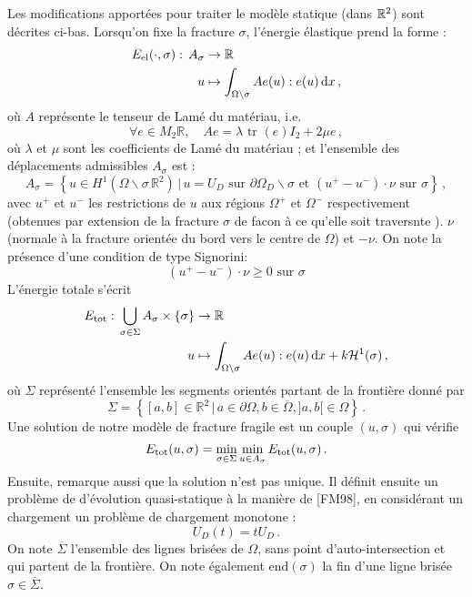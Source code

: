 Les modifications apportées pour traiter le modèle statique (dans $\mathbb{R}^2$) sont décrites ci-bas. Lorsqu'on fixe la fracture $\sigma$, l'énergie élastique prend la forme :
\begin{align*}
\eel (\cdot,\sigma): \, A_{\sigma} &\rightarrow \mathbb{R} \\
u &\mapsto \int_{\Omega \backslash \sigma} Ae(u) : e(u) \diff x \,,
\end{align*}
où $A$ représente le tenseur de Lamé du matériau, i.e.
$$
    \forall e \in M_2{\mathbb{R}}, \quad Ae = \lambda \text{ tr }(e)I_2 + 2\mu e \,,
$$ 
où $\lambda$ et $\mu$ sont les coefficients de Lamé du matériau ; et l'ensemble des déplacements admissibles $A_{\sigma}$ est :
$$
A_{\sigma} = \left\{  u \in H^1(\Omega \backslash \sigma \, \mathbb{R}^2) \, \rvert \, u=U_D \text{ sur } \partial \Omega_D \backslash \sigma \text{ et } (u^+ - u^{-}) \cdot \nu \text{ sur } \sigma \right\} \,,
$$
avec $u^{+}$ et $u^{−}$ les restrictions de $u$ aux régions $\Omega^{+}$ et $\Omega^{-}$ respectivement (obtenues par extension de la fracture $\sigma$ de facon à ce qu'elle soit traversnte \parencite[p.50]{balasoiu2020thesis}). $\nu$ (normale à la fracture orientée du bord vers le centre de $\Omega$) et $−\nu$. On note la présence d'une condition de type Signorini:
$$
(u^+ - u^{-}) \cdot \nu \geq 0 \text{  sur  } \sigma
$$
L'énergie totale s'écrit
\begin{align*}
\etot : \,\bigcup_{\sigma \in \Sigma } A_{\sigma} \times \left\{ \sigma \right\} &\rightarrow \mathbb{R} \\
 u &\mapsto \int_{\Omega \backslash \sigma} Ae(u) : e(u) \diff x + k\mathcal{H}^1(\sigma)\,,
\end{align*}
où $\Sigma$ représenté l'ensemble les segments orientés partant de la frontière donné par 
$$
\Sigma = \left\{ [a,b] \in \mathbb{R}^2 \, \lvert \, a \in \partial\Omega, b\in \overline{\Omega}, ]a,b[ \in \Omega\right\} \,.
$$
Une solution de notre modèle de fracture fragile est un couple $(u, \sigma)$ qui vérifie
$$
E_{\text{tot}}(u,\sigma) = \min_{\sigma \in \Sigma}{\min_{u\in A_{\sigma}}{E_{\text{tot}}(u,\sigma)}} \,.
$$
Ensuite, \citeauthor{balasoiu2020thesis} remarque aussi que la solution n'est pas unique. Il définit ensuite un problème de d'évolution quasi-statique à la manière de [FM98], en considérant un chargement un problème de chargement monotone : 
$$
U_D(t) = tU_D \,.
$$
On note $\overline{\Sigma}$ l’ensemble des lignes brisées de $\Omega$, sans point d’auto-intersection et qui partent de la frontière. On note également $\text{end}(\sigma)$ la fin d’une ligne brisée $\sigma \in  \overline{\Sigma}$.

